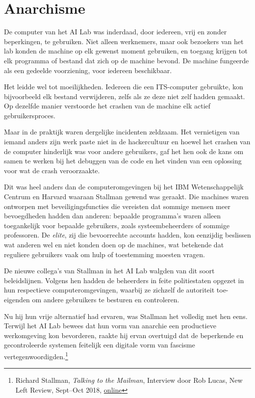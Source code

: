 \documentclass[
  a5paper,
  smalldemyvopaper,11pt,twoside,onecolumn,openright,extrafontsizes,
hidelinks]{memoir}
\begin{document}
\section{Anarchisme}\label{anarchisme}

De computer van het AI Lab was inderdaad, door iedereen, vrij en zonder
beperkingen, te gebruiken. Niet alleen werknemers, maar ook bezoekers
van het lab konden de machine op elk gewenst moment gebruiken, en
toegang krijgen tot elk programma of bestand dat zich op de machine
bevond. De machine fungeerde als een gedeelde voorziening, voor iedereen
beschikbaar.

Het leidde wel tot moeilijkheden. Iedereen die een ITS-computer
gebruikte, kon bijvoorbeeld elk bestand verwijderen, zelfs als ze deze
niet zelf hadden gemaakt. Op dezelfde manier verstoorde het crashen van
de machine elk actief gebruikersproces.

Maar in de praktijk waren dergelijke incidenten zeldzaam. Het
vernietigen van iemand anders zijn werk paste niet in de hackercultuur
en hoewel het crashen van de computer hinderlijk was voor andere
gebruikers, gaf het hen ook de kans om samen te werken bij het debuggen
van de code en het vinden van een oplossing voor wat de crash
veroorzaakte.

Dit was heel anders dan de computeromgevingen bij het IBM
Wetenschappelijk Centrum en Harvard waaraan Stallman gewend was geraakt.
Die machines waren ontworpen met beveiligingsfuncties die vereisten dat
sommige mensen meer bevoegdheden hadden dan anderen: bepaalde
programma's waren alleen toegankelijk voor bepaalde gebruikers, zoals
systeembeheerders of sommige professoren. De \emph{elite}, zij die
bevoorrechte accounts hadden, kon eenzijdig beslissen wat anderen wel en
niet konden doen op de machines, wat betekende dat reguliere gebruikers
vaak om hulp of toestemming moesten vragen.

De nieuwe collega's van Stallman in het AI Lab walgden van dit soort
beleidslijnen. Volgens hen hadden de beheerders in feite politiestaten
opgezet in hun respectieve computeromgevingen, waarbij ze zichzelf de
autoriteit toe-eigenden om andere gebruikers te besturen en controleren.

Nu hij hun vrije alternatief had ervaren, was Stallman het volledig met
hen eens. Terwijl het AI Lab bewees dat hun vorm van anarchie een
productieve werkomgeving kon bevorderen, raakte hij ervan overtuigd dat
de beperkende en gecontroleerde systemen feitelijk een digitale vorm van
fascisme vertegenwoordigden.\footnote{\hspace{0pt}Richard Stallman,
  \emph{Talking to the Mailman}, Interview door Rob Lucas, New Left
  Review, Sept--Oct 2018,
  \href{https://newleftreview.org/issues/ii113/articles/richard-stallman-talking-to-the-mailman}{online}}
\end{document}
